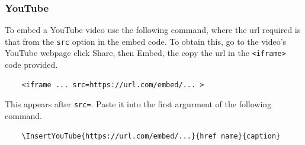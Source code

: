 \documentclass{article}
\begin{document}
\subsubsection{YouTube}
To embed a YouTube video use the following command, where the url required is that from the \verb'src' option in the embed code. To obtain this, go to the video's YouTube webpage click Share, then Embed, the copy the url in the \verb'<iframe>' code provided.
\begin{verbatim}
    <iframe ... src=https://url.com/embed/... >
\end{verbatim}
This appears after \verb'src='. Paste it into the first argurment of the following command.
\begin{verbatim}
    \InsertYouTube{https://url.com/embed/...}{href name}{caption}
\end{verbatim}



\end{document}

